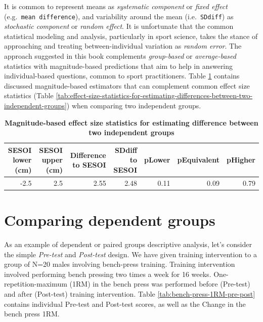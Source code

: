 \documentclass[
]{book}
\begin{document}
It is common to represent means as \emph{systematic component} or \emph{fixed effect} (e.g.~\texttt{mean\ difference}), and variability around the mean (i.e.~\texttt{SDdiff}) as \emph{stochastic component} or \emph{random effect}. It is unfortunate that the common statistical modeling and analysis, particularly in sport science, takes the stance of approaching and treating between-individual variation as \emph{random error}. The approach suggested in this book complements \emph{group-based} or \emph{average-based} statistics with magnitude-based predictions that aim to help in answering individual-based questions, common to sport practitioners. Table \ref{tab:magnitude-based-estimators-diff} contains discussed magnitude-based estimators that can complement common effect size statistics (Table \ref{tab:effect-size-statistics-for-estimating-differences-between-two-independent-groups}) when comparing two independent groups.



\begin{table}

\caption{\label{tab:magnitude-based-estimators-diff}\textbf{Magnitude-based effect size statistics for estimating difference between two independent groups}}
\centering
\begin{tabular}[t]{rrrrrrr}
\toprule
SESOI lower (cm) & SESOI upper (cm) & Difference to SESOI & SDdiff to SESOI & pLower & pEquivalent & pHigher\\
\midrule
-2.5 & 2.5 & 2.55 & 2.48 & 0.11 & 0.09 & 0.79\\
\bottomrule
\end{tabular}
\end{table}

\hypertarget{comparing-dependent-groups}{%
\section{Comparing dependent groups}\label{comparing-dependent-groups}}

As an example of dependent or paired groups descriptive analysis, let's consider the simple \emph{Pre-test} and \emph{Post-test} design. We have given training intervention to a group of N=20 males involving bench-press training. Training intervention involved performing bench pressing two times a week for 16 weeks. One-repetition-maximum (1RM) in the bench press was performed before (Pre-test) and after (Post-test) training intervention. Table \ref{tab:bench-press-1RM-pre-post} contains individual Pre-test and Post-test scores, as well as the Change in the bench press 1RM.
\end{document}
